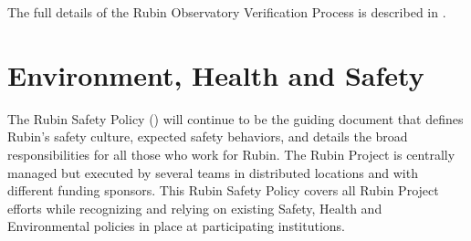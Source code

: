 \documentclass[SE,lsstdraft,authoryear,toc]{lsstdoc}
\begin{document}
The full details of the Rubin Observatory Verification Process is described in .

%

\section{Environment, Health and Safety}

The Rubin Safety Policy () will continue to be the guiding document that defines Rubin's safety culture, expected safety behaviors, and details the broad responsibilities for all those who work for Rubin.
The Rubin Project is centrally managed but executed by several teams in distributed locations and with different funding sponsors.
This Rubin Safety Policy covers all Rubin Project efforts while recognizing and relying on existing Safety,
Health and Environmental policies in place at participating institutions.
\end{document}
